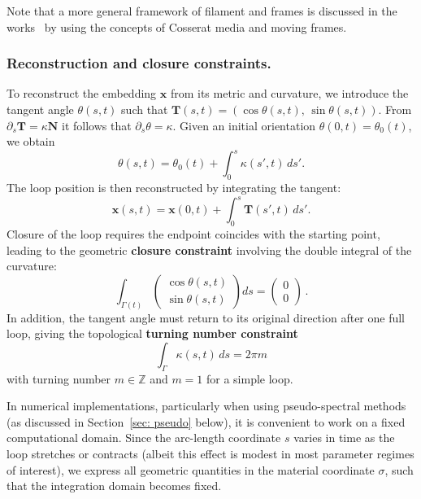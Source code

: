 \documentclass[
aip,
jcp,
reprint, 
floatfix
]{revtex4-1}
\begin{document}
Note that a more general framework of filament and frames is discussed in the works~\cite{kikuchi2024rare, nemeth2024geometric, epstein1998geometrical} by using the concepts of Cosserat media and moving frames. 

\subsubsection{Reconstruction and closure constraints.}
\label{sec: recon}

To reconstruct the embedding $\mathbf{x}$ from its metric and curvature, we introduce the tangent angle $\theta(s,t)$ such that
$
\mathbf{T}(s,t) = (\cos\theta(s,t),\,\sin\theta(s,t)).
$
From $\partial_s\mathbf{T}=\kappa\mathbf{N}$ it follows that
$
\partial_s\theta = \kappa.
$
Given an initial orientation $\theta(0,t) = \theta_0(t)$, we obtain
\begin{equation}\label{eq: theta}
    \theta(s,t) = \theta_0(t) + \int_0^s \kappa(s',t)\,ds'.
\end{equation}
The loop position is then reconstructed by integrating the tangent:
\begin{equation}
    \mathbf{x}(s,t)
    = \mathbf{x}(0,t)
    + \int_0^s \mathbf{T}(s',t)\,ds'.
    \label{eq:reconstruction}
\end{equation}
Closure of the loop requires the endpoint coincides with the starting point, leading to the geometric {\bf closure constraint} involving the double integral of the curvature:
\begin{equation}
    \int_{\Gamma(t)}
    \begin{pmatrix}
    \cos\theta(s,t)\\[2pt]
    \sin\theta(s,t)
    \end{pmatrix}
    ds
    =
    \begin{pmatrix}
    0\\[2pt]
    0
    \end{pmatrix}\,.
     \label{eq:closure}
\end{equation}
In addition, the tangent angle must return to its original direction after one full loop, giving the topological {\bf turning number constraint}
\begin{equation}
    \int_{\Gamma} \kappa(s,t)\,ds = 2\pi m
    \label{eq: turning}
\end{equation}
with turning number $m\in\mathbb{Z}$ and $m=1$ for a simple loop.

In numerical implementations, particularly when using pseudo-spectral methods (as discussed in Section~\ref{sec: pseudo} below), it is convenient to work on a fixed computational domain. Since the arc-length coordinate $s$ varies in time as the loop stretches or contracts (albeit this effect is modest in most parameter regimes of interest), we express all geometric quantities in the material coordinate $\sigma$, such that the integration domain becomes fixed. 
\end{document}
